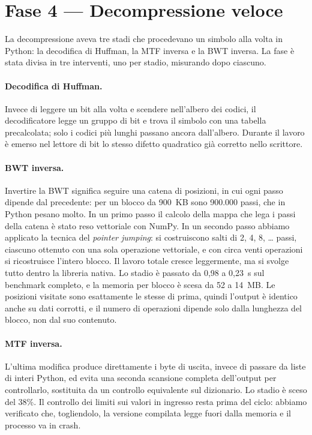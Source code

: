\documentclass[11pt,a4paper]{article}
\begin{document}
\section{Fase 4 --- Decompressione veloce}

La decompressione aveva tre stadi che procedevano un simbolo alla volta in Python: la
decodifica di Huffman, la MTF inversa e la BWT inversa. La fase è stata divisa in tre
interventi, uno per stadio, misurando dopo ciascuno.

\paragraph{Decodifica di Huffman.} Invece di leggere un bit alla volta e scendere
nell'albero dei codici, il decodificatore legge un gruppo di bit e trova il simbolo con una
tabella precalcolata; solo i codici più lunghi passano ancora dall'albero. Durante il lavoro
è emerso nel lettore di bit lo stesso difetto quadratico già corretto nello scrittore.

\paragraph{BWT inversa.} Invertire la BWT significa seguire una catena di posizioni, in cui
ogni passo dipende dal precedente: per un blocco da 900~KB sono 900.000 passi, che in Python
pesano molto. In un primo passo il calcolo della mappa che lega i passi della catena è stato
reso vettoriale con NumPy. In un secondo passo abbiamo applicato la tecnica del \emph{pointer
jumping}: si costruiscono salti di 2, 4, 8, \dots{} passi, ciascuno ottenuto con una sola
operazione vettoriale, e con circa venti operazioni si ricostruisce l'intero blocco. Il
lavoro totale cresce leggermente, ma si svolge tutto dentro la libreria nativa. Lo stadio è
passato da 0,98 a 0,23~s sul benchmark completo, e la memoria per blocco è scesa da 52 a
14~MB. Le posizioni visitate sono esattamente le stesse di prima, quindi l'output è identico
anche su dati corrotti, e il numero di operazioni dipende solo dalla lunghezza del blocco,
non dal suo contenuto.

\paragraph{MTF inversa.} L'ultima modifica produce direttamente i byte di uscita, invece di
passare da liste di interi Python, ed evita una seconda scansione completa dell'output per
controllarlo, sostituita da un controllo equivalente sul dizionario. Lo stadio è sceso del
38\%. Il controllo dei limiti sui valori in ingresso resta prima del ciclo: abbiamo
verificato che, togliendolo, la versione compilata legge fuori dalla memoria e il processo
va in crash.
\end{document}
